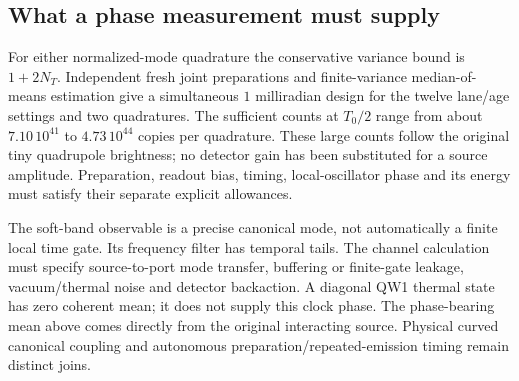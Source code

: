 \documentclass[10pt,twocolumn,letterpaper]{article}
\begin{document}
\subsection{What a phase measurement must supply}
For either normalized-mode quadrature the conservative variance bound is
$1+2N_T$. Independent fresh joint preparations and finite-variance
median-of-means estimation give a simultaneous $1$ milliradian design for
the twelve lane/age settings and two quadratures. The sufficient counts
at $T_0/2$ range from about $7.10\,10^{41}$ to $4.73\,10^{44}$ copies
per quadrature. These large counts follow the original tiny quadrupole
brightness; no detector gain has been substituted for a source amplitude.
Preparation, readout bias, timing, local-oscillator phase and its energy
must satisfy their separate explicit allowances.

The soft-band observable is a precise canonical mode, not automatically a
finite local time gate. Its frequency filter has temporal tails. The
channel calculation must specify source-to-port mode transfer, buffering
or finite-gate leakage, vacuum/thermal noise and detector backaction.
A diagonal QW1 thermal state has zero coherent mean; it does not supply
this clock phase. The phase-bearing mean above comes directly from the
original interacting source. Physical curved canonical coupling and
autonomous preparation/repeated-emission timing remain distinct joins.
\end{document}
